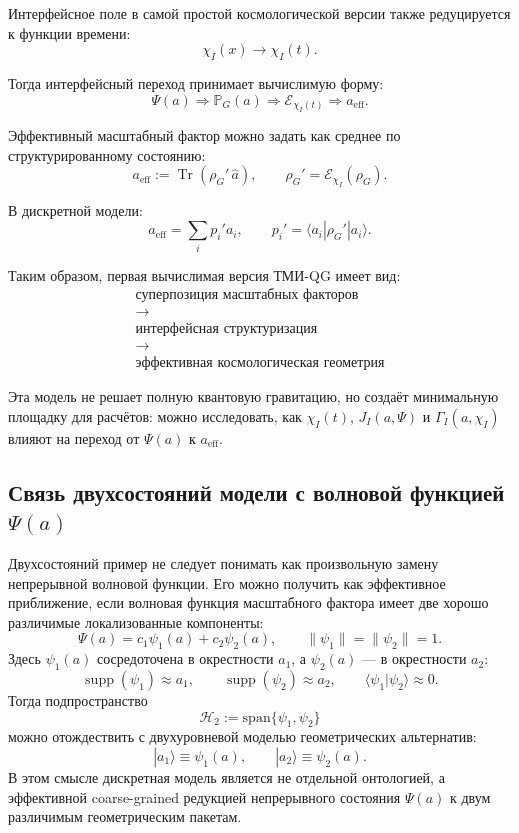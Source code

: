 \documentclass[12pt,a4paper]{article}
\DeclareMathOperator{\Tr}{Tr}
\DeclareMathOperator{\supp}{supp}
\newcommand{\Hilb}{\mathcal H}
\newcommand{\Prob}{\mathbb P}
\newcommand{\Eff}{\mathrm{eff}}
\begin{document}
Интерфейсное поле в самой простой космологической версии также редуцируется к функции времени:
\[
\boxed{
\chi_I(x)
\longrightarrow
\chi_I(t).
}
\]

Тогда интерфейсный переход принимает вычислимую форму:
\[
\boxed{
\Psi(a)
\Rightarrow
\Prob_G(a)
\Rightarrow
\mathcal E_{\chi_I(t)}
\Rightarrow
 a_{\Eff}.
}
\]

Эффективный масштабный фактор можно задать как среднее по структурированному состоянию:
\[
\boxed{
a_{\Eff}
:=
\Tr(\rho_G'\,\widehat a),
\qquad
\rho_G'=\mathcal E_{\chi_I}(\rho_G).
}
\]

В дискретной модели:
\[
\boxed{
a_{\Eff}
=
\sum_i p_i' a_i,
\qquad
p_i'=\langle a_i|\rho_G'|a_i\rangle.
}
\]

Таким образом, первая вычислимая версия ТМИ-QG имеет вид:
\[
\boxed{
\begin{gathered}
\text{суперпозиция масштабных факторов}\\
\longrightarrow\\
\text{интерфейсная структуризация}\\
\longrightarrow\\
\text{эффективная космологическая геометрия}
\end{gathered}
}
\]

Эта модель не решает полную квантовую гравитацию, но создаёт минимальную площадку для расчётов: можно исследовать, как $\chi_I(t)$, $J_I(a,\Psi)$ и $\Gamma_I(a,\chi_I)$ влияют на переход от $\Psi(a)$ к $a_{\Eff}$.



\subsection{Связь двухсостояний модели с волновой функцией \texorpdfstring{$\Psi(a)$}{Psi(a)}}

Двухсостояний пример не следует понимать как произвольную замену непрерывной волновой функции. Его можно получить как эффективное приближение, если волновая функция масштабного фактора имеет две хорошо различимые локализованные компоненты:
\[
\boxed{
\Psi(a)=c_1\psi_1(a)+c_2\psi_2(a),
\qquad
\|\psi_1\|=\|\psi_2\|=1.
}
\]
Здесь $\psi_1(a)$ сосредоточена в окрестности $a_1$, а $\psi_2(a)$ --- в окрестности $a_2$:
\[
\boxed{
\supp(\psi_1)\approx a_1,
\qquad
\supp(\psi_2)\approx a_2,
\qquad
\langle\psi_1|\psi_2\rangle\approx0.
}
\]
Тогда подпространство
\[
\boxed{
\Hilb_2:=\mathrm{span}\{\psi_1,\psi_2\}
}
\]
можно отождествить с двухуровневой моделью геометрических альтернатив:
\[
\boxed{
|a_1\rangle\equiv\psi_1(a),
\qquad
|a_2\rangle\equiv\psi_2(a).
}
\]
В этом смысле дискретная модель является не отдельной онтологией, а эффективной coarse-grained редукцией непрерывного состояния $\Psi(a)$ к двум различимым геометрическим пакетам.
\end{document}
